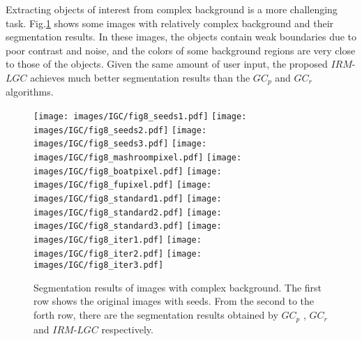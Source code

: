    Extracting objects of interest from complex background is a more
challenging task. Fig.\ref{IGC:fig:segment2} shows some images with
relatively complex background and their segmentation results. In
these images, the objects contain weak boundaries due to poor
contrast and noise, and the colors of some background regions are
very close to those of the objects. Given the same amount of user
input, the proposed $IRM$-$LGC$ achieves much better segmentation
results than the $GC_p$ and $GC_r$ algorithms.
  \begin{figure}[htp]
        \centering
        {{\texttt{[image: images/IGC/fig8\_seeds1.pdf]}}
        {\texttt{[image: images/IGC/fig8\_seeds2.pdf]}}
        {\texttt{[image: images/IGC/fig8\_seeds3.pdf]}}
        {\texttt{[image: images/IGC/fig8\_mashroompixel.pdf]}}
        {\texttt{[image: images/IGC/fig8\_boatpixel.pdf]}}
        {\texttt{[image: images/IGC/fig8\_fupixel.pdf]}}
        {\texttt{[image: images/IGC/fig8\_standard1.pdf]}}
        {\texttt{[image: images/IGC/fig8\_standard2.pdf]}}
        {\texttt{[image: images/IGC/fig8\_standard3.pdf]}}
        {\texttt{[image: images/IGC/fig8\_iter1.pdf]}}
        {\texttt{[image: images/IGC/fig8\_iter2.pdf]}}
        {\texttt{[image: images/IGC/fig8\_iter3.pdf]}}
        }
        \caption{Segmentation results of images with complex background.
        The first row shows the original images with seeds. From the second
        to the forth row, there are the segmentation results obtained by
        $GC_p$ , $GC_r$ and $IRM$-$LGC$ respectively.}
        \label{IGC:fig:segment2}
        \end{figure}

